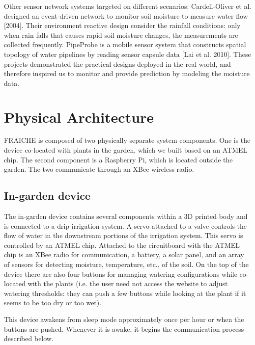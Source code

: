 \documentclass[a4paper]{acm_proc_article-sp}
\makeatletter
\newcommand{\ie}{i.e.\@\xspace}
\newcommand{\etc}{etc.\@\xspace}
\makeatother
\begin{document}
Other sensor network systems targeted on different scenarios: Cardell-Oliver et al. designed an event-driven network to monitor soil moisture to measure water flow [2004]. Their environment reactive design consider the rainfall conditions: only when rain falls that causes rapid soil moisture changes, the measurements are collected frequently. PipeProbe is a mobile sensor system that constructs spatial topology of water pipelines by reading sensor capsule data [Lai et al. 2010]. These projects demonstrated the practical designs deployed in the real world, and therefore inspired us to monitor and provide prediction by modeling the moisture data.


\section{Physical Architecture}

FRAICHE is composed of two physically separate system components.  One is the device co-located with plants in the garden, which we built based on an ATMEL chip.  The second component is a Raspberry Pi, which is located outside the garden.  The two communicate through an XBee wireless radio.

\subsection{In-garden device}

The in-garden device contains several components within a 3D printed body and is connected to a drip irrigation system.  A servo attached to a valve controls the flow of water in the downstream portions of the irrigation system.  This servo is controlled by an ATMEL chip.  Attached to the circuitboard with the ATMEL chip is an XBee radio for communication, a battery, a solar panel, and an array of sensors for detecting moisture, temperature, \etc, of the soil.  On the top of the device there are also four buttons for managing watering configurations while co-located with the plants (\ie the user need not access the website to adjust watering thresholds: they can push a few buttons while looking at the plant if it seems to be too dry or too wet).

This device awakens from sleep mode approximately once per hour or when the buttons are pushed.  Whenever it is awake, it begins the communication process described below.
\end{document}
